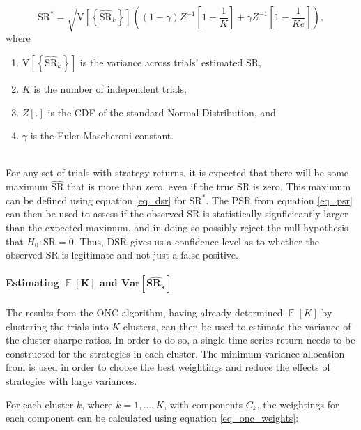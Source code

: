 \documentclass[a4paper,11pt,oneside]{article}
\newcommand{\Var}{\mathbf{Var}}
\DeclareMathOperator*{\E}{\mathbb{E}}
\theoremstyle{plain}
\theoremstyle{definition}
\begin{document}
	\begin{equation}\label{eq_dsr}
	\mathrm{SR}^{*}=\sqrt{\mathrm{V}\left[\left\{\widehat{\mathrm{SR}}_{k}\right\}\right]}\left((1-\gamma) Z^{-1}\left[1-\frac{1}{K}\right]+\gamma Z^{-1}\left[1-\frac{1}{K e}\right]\right), 
	\end{equation}
	where
	\begin{enumerate}
		\item $\mathrm{V}\left[\left\{\widehat{\mathrm{SR}}_{k}\right\}\right]$ is the variance across trials' estimated SR, 
		\item $K$ is the number of independent trials, 
		\item $Z[.]$ is the CDF of the standard Normal Distribution, and
		\item $\gamma$ is the Euler-Mascheroni constant.
	\end{enumerate}
	~\\
	For any set of trials with strategy returns, it is expected that there will be some maximum $\widehat{\mathrm{SR}}$ that is more than zero, even if the true $\mathrm{SR}$ is zero. This maximum can be defined using equation \eqref{eq_dsr} for $\mathrm{SR}^*$. The PSR from equation \eqref{eq_psr} can then be used to assess if the observed SR is statistically signficicantly larger than the expected maximum, and in doing so possibly reject the null hypothesis that $H_0: \mathrm{SR} = 0$. Thus, DSR gives us a confidence level as to whether the observed SR is legitimate and not just a false positive.
	
	\paragraph{Estimating $\mathbf{\E}\left[\mathbf{K}\right]$ and $\mathbf{\Var}\left[\widehat{\mathbf{SR_k}}\right]$}\label{dsr_cluster_estimates}
	
	The results from the ONC algorithm, having already determined $\mathbf{\E}\left[K\right]$ by clustering the trials into $K$ clusters, can then be used to estimate the variance of the cluster sharpe ratios. In order to do so, a single time series return needs to be constructed for the strategies in each cluster. The minimum variance allocation from \citet{LopezPrado2016a} is used in order to choose the best weightings and reduce the effects of strategies with large variances.\newline

	For each cluster $k$, where $k = 1, ..., K$, with components $C_k$, the weightings for each component can be calculated using equation \eqref{eq_onc_weights}:
	
\end{document}
